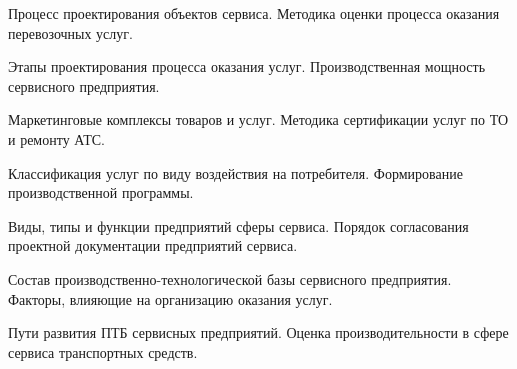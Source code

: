 \documentclass[
	14pt,
	a4paper,
	]
	{scrartcl}
\begin{document}
\shapk
{}
\setcounter{zad}{0}

\vfill
\z Процесс проектирования объектов сервиса.
 \vfill
\z Методика оценки процесса оказания перевозочных услуг. \vfill

\vfill

\newpage


\shapk
{}
\setcounter{zad}{0}

\vfill
\z Этапы проектирования процесса оказания услуг.
 \vfill
\z Производственная мощность сервисного предприятия.
 \vfill

\vfill

\newpage


\shapk
{}
\setcounter{zad}{0}

\vfill
\z Маркетинговые комплексы товаров и услуг.
 \vfill
\z Методика сертификации услуг по ТО и ремонту АТС.
 \vfill

\vfill

\newpage


\shapk
{}
\setcounter{zad}{0}

\vfill
\z Классификация услуг по виду воздействия на потребителя.
 \vfill
\z Формирование производственной программы.
 \vfill

\vfill

\newpage


\shapk
{}
\setcounter{zad}{0}

\vfill
\z Виды, типы и функции предприятий сферы сервиса.
 \vfill
\z Порядок согласования проектной документации предприятий сервиса.
 \vfill

\vfill

\newpage


\shapk
{}
\setcounter{zad}{0}

\vfill
\z Состав производственно-технологической базы сервисного предприятия.
 \vfill
\z Факторы, влияющие на организацию оказания услуг.
 \vfill

\vfill

\newpage


\shapk
{}
\setcounter{zad}{0}

\vfill
\z Пути развития ПТБ сервисных предприятий.
 \vfill
\z Оценка производительности в сфере сервиса транспортных средств.
 \vfill

\vfill

\newpage


\shapk
{}
\setcounter{zad}{0}
\end{document}
